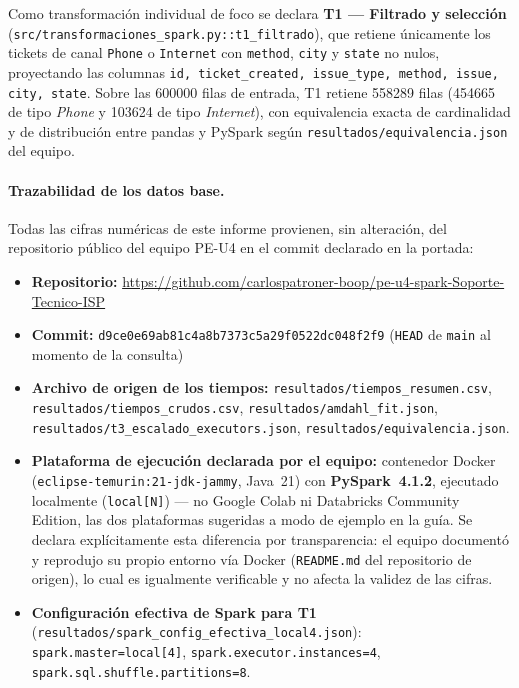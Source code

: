 \documentclass[11pt,a4paper]{article}
\newcommand{\repoteam}{\url{https://github.com/carlospatroner-boop/pe-u4-spark-Soporte-Tecnico-ISP}}
\newcommand{\committeam}{\texttt{d9ce0e69ab81c4a8b7373c5a29f0522dc048f2f9}}
\begin{document}
Como transformaci\'on individual de foco se declara \textbf{T1 --- Filtrado y selecci\'on}
(\texttt{src/\allowbreak{}transformaciones\_spark.py::\allowbreak{}t1\_filtrado}), que retiene \'unicamente los
tickets de canal \texttt{Phone} o \texttt{Internet} con \texttt{method}, \texttt{city} y
\texttt{state} no nulos, proyectando las columnas
\texttt{id, ticket\_created, issue\_type, method, issue, city, state}. Sobre las
\num{600000} filas de entrada, T1 retiene \num{558289} filas (\num{454665} de tipo
\textit{Phone} y \num{103624} de tipo \textit{Internet}), con equivalencia exacta de
cardinalidad y de distribuci\'on entre pandas y PySpark seg\'un
\texttt{resultados/\allowbreak{}equivalencia.json} del equipo.

\paragraph{Trazabilidad de los datos base.} Todas las cifras num\'ericas de este informe
provienen, sin alteraci\'on, del repositorio p\'ublico del equipo PE-U4 en el commit
declarado en la portada:
\begin{itemize}
  \item \textbf{Repositorio:} \repoteam
  \item \textbf{Commit:} \committeam{} (\texttt{HEAD} de \texttt{main} al momento de la consulta)
  \item \textbf{Archivo de origen de los tiempos:} \texttt{resultados/\allowbreak{}tiempos\_resumen.csv},
    \texttt{resultados/\allowbreak{}tiempos\_crudos.csv}, \texttt{resultados/\allowbreak{}amdahl\_fit.json},
    \texttt{resultados/\allowbreak{}t3\_escalado\_executors.json}, \texttt{resultados/\allowbreak{}equivalencia.json}.
  \item \textbf{Plataforma de ejecuci\'on declarada por el equipo:} contenedor Docker
    (\texttt{eclipse-\allowbreak{}temurin:21-\allowbreak{}jdk-\allowbreak{}jammy}, Java~21) con \textbf{PySpark~4.1.2}, ejecutado
    localmente (\texttt{local[N]}) --- no Google Colab ni Databricks Community Edition, las
    dos plataformas sugeridas a modo de ejemplo en la gu\'ia. Se declara expl\'icitamente
    esta diferencia por transparencia: el equipo document\'o y reprodujo su propio entorno
    v\'ia Docker (\texttt{README.md} del repositorio de origen), lo cual es igualmente
    verificable y no afecta la validez de las cifras.
  \item \textbf{Configuraci\'on efectiva de Spark para T1} (\texttt{resultados/\allowbreak{}spark\_config\_efectiva\_local4.json}):
    \texttt{spark.master=local[4]}, \texttt{spark.executor.\allowbreak{}instances=4},
    \texttt{spark.sql.\allowbreak{}shuffle.\allowbreak{}partitions=8}.
\end{itemize}
\end{document}

